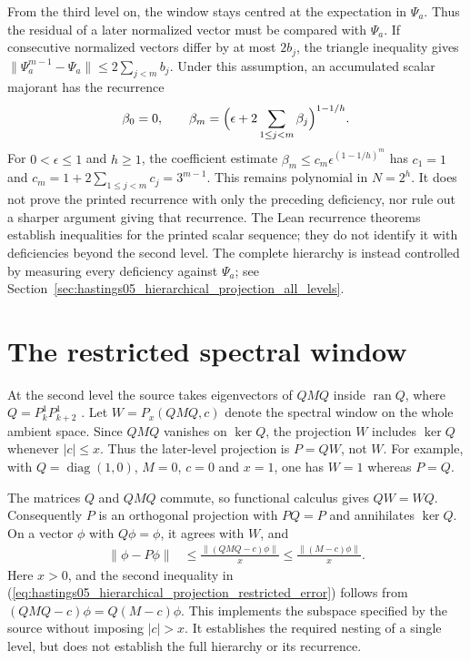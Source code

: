 \documentclass{article}
\begin{document}
From the third level on, the window stays centred at the expectation in
$\Psi_a$. Thus the residual of a later normalized vector must be compared
with $\Psi_a$. If consecutive normalized vectors differ by at most $2b_j$,
the triangle inequality gives
$\lVert\Psi^{m-1}_a-\Psi_a\rVert\le2\sum_{j<m}b_j$. Under this assumption,
an accumulated scalar majorant has the recurrence
\begin{align}\label{eq:hastings05_hierarchical_projection_accumulated_recurrence}
    \beta_0=0,\qquad
    \beta_m=\Bigl(\epsilon+2\sum_{1\le j<m}\beta_j\Bigr)^{1-1/h}.
\end{align}
For $0<\epsilon\le1$ and $h\ge1$, the coefficient estimate
$\beta_m\le c_m\epsilon^{(1-1/h)^m}$ has
$c_1=1$ and $c_m=1+2\sum_{1\le j<m}c_j=3^{m-1}$.
This remains polynomial in $N=2^h$. It does not prove the printed
recurrence with only the preceding deficiency, nor rule out a sharper
argument giving that recurrence. The Lean
recurrence theorems establish inequalities for the printed scalar sequence;
they do not identify it with deficiencies beyond the second level. The
complete hierarchy is instead controlled by measuring every deficiency
against $\Psi_a$; see
Section~\ref{sec:hastings05_hierarchical_projection_all_levels}.

\newpage
\section{The restricted spectral window}

At the second level the source takes eigenvectors of $QMQ$ inside
$\operatorname{ran}Q$, where $Q=P^1_kP^1_{k+2}$
\cite[lines 673--685]{Hastings2006Solving}.
Let $W=P_x(QMQ,c)$ denote the spectral window on the whole ambient space.
Since $QMQ$ vanishes on $\ker Q$, the projection $W$ includes $\ker Q$
whenever $|c|\le x$. Thus the later-level projection is $P=QW$, not $W$.
For example, with $Q=\operatorname{diag}(1,0)$, $M=0$, $c=0$ and $x=1$,
one has $W=1$ whereas $P=Q$.

The matrices $Q$ and $QMQ$ commute, so functional calculus gives $QW=WQ$.
Consequently $P$ is an orthogonal projection with $PQ=P$ and annihilates
$\ker Q$. On a vector $\phi$ with $Q\phi=\phi$, it agrees with $W$, and
\begin{align}\label{eq:hastings05_hierarchical_projection_restricted_error}
    \lVert\phi-P\phi\rVert
     & \le\frac{\lVert(QMQ-c)\phi\rVert}{x}
    \le\frac{\lVert(M-c)\phi\rVert}{x}.
\end{align}
Here $x>0$, and the second inequality in
(\ref{eq:hastings05_hierarchical_projection_restricted_error}) follows from
$(QMQ-c)\phi=Q(M-c)\phi$. This implements the subspace specified by the
source without imposing $|c|>x$. It establishes the required nesting of a
single level, but does not establish the full hierarchy or its recurrence.
\end{document}
